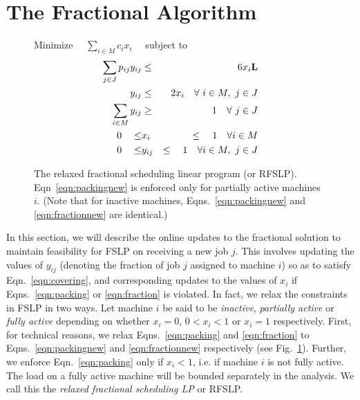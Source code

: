 \documentclass[11pt]{article}
\begin{document}
\section{The Fractional Algorithm}
\label{sec:fractional}

\begin{figure}[!htb]
	\small
	\centering
	Minimize $\quad\sum_{i\in M} c_i x_i\quad$ subject to
	\begin{eqnarray}
		\label{eqn:packingnew}	\sum_{j\in J} p_{ij} y_{ij} & \leq & 6 x_i {\bf L} \\
		\label{eqn:fractionnew}		y_{ij} & \leq & 2 x_i\quad \forall~i\in M,~j\in J \\
		\label{eqn:coveringnew}		\sum_{i\in M} y_{ij} & \geq & 1\quad \forall~j\in J \\
		\label{eqn:range1new}		0\quad \leq & x_i & \leq \quad 1 \quad \forall i\in M \\
		\label{eqn:range2new}		0\quad \leq & y_{ij} & \leq \quad 1 \quad \forall i\in M,~j\in J 
	\end{eqnarray}
	\caption{\small The relaxed fractional scheduling linear program (or RFSLP). 
		Eqn~\ref{eqn:packingnew} is enforced only for partially active machines $i$.
		(Note that for inactive machines, Eqns.~\ref{eqn:packingnew} and
		\ref{eqn:fractionnew} are identical.)}
	\label{fig:lp-relaxed}
\end{figure}

In this section, we will describe the online updates to the fractional
solution to maintain feasibility for FSLP on receiving a new job $j$. 
This involves updating the values of 
$y_{ij}$ (denoting the fraction of job $j$ assigned to machine $i$)
so as to satisfy Eqn.~\ref{eqn:covering}, and corresponding updates 
to the values of $x_i$ if Eqns.~\ref{eqn:packing} or \ref{eqn:fraction}
is violated. 
In fact, we relax the constraints in FSLP in two ways.
Let machine $i$ be said to be {\em inactive}, {\em partially active} or
{\em fully active} depending on whether $x_i = 0$, $0 < x_i < 1$ or
$x_i = 1$ respectively. First, for technical reasons, 
we relax Eqns.~\ref{eqn:packing} and \ref{eqn:fraction} 
to Eqns.~\ref{eqn:packingnew} and \ref{eqn:fractionnew} respectively
(see Fig.~\ref{fig:lp-relaxed}). Further, we 
enforce Eqn.~\ref{eqn:packing} only if $x_i < 1$, i.e. if machine 
$i$ is not fully active. The load on a fully active machine will
be bounded separately in the analysis.
We call this the {\em relaxed fractional scheduling LP} or RFSLP.
\end{document}
